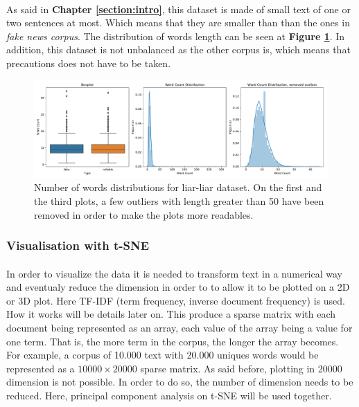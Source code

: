 \paragraph{} As said in \textbf{Chapter \ref{section:intro}}, this dataset is made of small text of one or two sentences at most. Which means that they are smaller than than the ones in \textit{fake news corpus}. The distribution of words length can be seen at \textbf{Figure \ref{fig:data_explo:summary3}}. In addition, this dataset is not unbalanced as the other corpus is, which means that precautions does not have to be taken. 
\begin{figure}[h]
  \centering
  \includegraphics[width=\textwidth]{chapter/images/data_exploration/liar_liar_summary.pdf}
  \caption{Number of words distributions for liar-liar dataset. On the first and the third plots, a few outliers with length greater than 50 have been removed in order to make the plots more readables.}
  \label{fig:data_explo:summary3}
\end{figure}

\subsubsection{Visualisation with t-SNE\cite{Maaten2008}}
\paragraph{} In order to visualize the data it is needed to transform text in a numerical way and eventualy reduce the dimension in order to to allow it to be plotted on a 2D or 3D plot. Here TF-IDF (term frequency, inverse document frequency) is used. How it works will be details later on. This produce a sparse matrix with each document being represented as an array, each value of the array being a value for one term. That is, the more term in the corpus, the longer the array becomes. For example, a corpus of 10.000 text with 20.000 uniques words would be represented as a $10000 \times 20000$ sparse matrix. As said before, plotting in 20000 dimension is not possible. In order to do so, the number of dimension needs to be reduced. Here, principal component analysis on t-SNE will be used together. 

